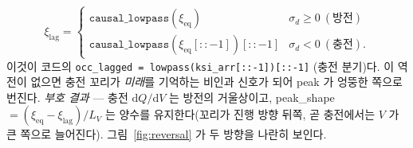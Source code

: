\documentclass[11pt,a4paper]{article}
\newcommand{\dd}{\mathrm{d}}
\newcommand{\eq}{\mathrm{eq}}
\newcommand{\code}[1]{\texttt{#1}}
\begin{document}
\begin{equation}
\xi_\mathrm{lag}=
\begin{cases}
\code{causal\_lowpass}(\xi_\eq) & \sigma_d\ge0\ (\text{방전})\\[2pt]
\code{causal\_lowpass}(\xi_\eq[::-1])[::-1] & \sigma_d<0\ (\text{충전}).
\end{cases}
\label{eq:reversal}
\end{equation}
이것이 코드의 \code{occ\_lagged = lowpass(ksi\_arr[::-1])[::-1]} (충전 분기)다. 이 역전이 없으면 충전 꼬리가
\emph{미래}를 기억하는 비인과 신호가 되어 peak 가 엉뚱한 쪽으로 번진다. \emph{부호 결과} — 충전 $\dd Q/\dd V$ 는 방전의
거울상이고, peak\_shape $=(\xi_\eq-\xi_\mathrm{lag})/L_V$ 는 양수를 유지한다(꼬리가 진행 방향 뒤쪽, 곧 충전에서는
$V$ 가 큰 쪽으로 늘어진다). 그림~\ref{fig:reversal} 가 두 방향을 나란히 보인다.
\end{document}
